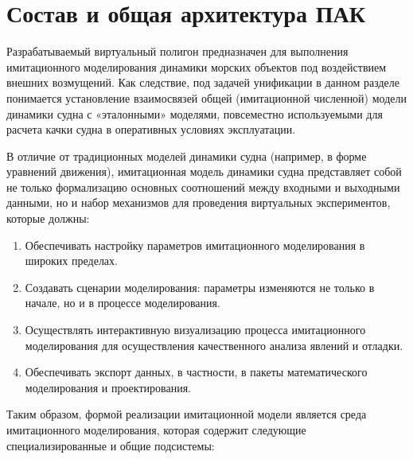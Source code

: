 \section{Состав и общая архитектура ПАК}

Разрабатываемый виртуальный полигон предназначен для выполнения имитационного моделирования 
динамики морских объектов под воздействием внешних возмущений. Как следствие, под задачей 
унификации в данном разделе понимается установление взаимосвязей общей (имитационной численной) 
модели динамики судна с «эталонными» моделями, повсеместно используемыми для расчета качки судна 
в оперативных условиях эксплуатации.

В отличие от традиционных моделей динамики судна (например, в форме уравнений движения), 
имитационная модель динамики судна представляет собой не только формализацию основных 
соотношений между входными и выходными данными, но и набор механизмов для проведения 
виртуальных экспериментов, которые должны:

\begin{enumerate}
\item	Обеспечивать настройку параметров имитационного моделирования в широких пределах.
\item	Создавать сценарии моделирования: параметры изменяются не только в начале, но и в процессе моделирования.
\item	Осуществлять интерактивную визуализацию процесса имитационного моделирования для осуществления качественного анализа явлений и отладки.
\item	Обеспечивать экспорт данных, в частности, в пакеты математического моделирования и проектирования.
\end{enumerate}

Таким образом, формой реализации имитационной модели является среда имитационного моделирования, которая содержит следующие специализированные и общие подсистемы:

